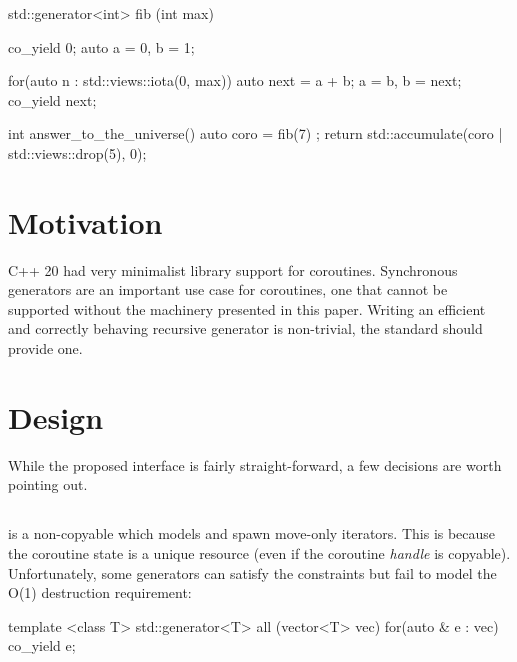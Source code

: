 \documentclass{wg21}
\begin{document}
\begin{colorblock}
    std::generator<int> fib (int max) {
        co_yield 0;
        auto a = 0, b = 1;

        for(auto n : std::views::iota(0, max))  {
            auto next = a + b;
            a = b, b = next;
            co_yield next;
        }
    }

    int answer_to_the_universe() {
        auto coro = fib(7) ;
        return std::accumulate(coro | std::views::drop(5), 0);
    }

\end{colorblock}

\section{Motivation}

C++ 20 had very minimalist library support for coroutines.
Synchronous generators are an important use case for coroutines, one that cannot be supported without
the machinery presented in this paper.
Writing an efficient and correctly behaving recursive generator is non-trivial, the standard should provide one.


\section{Design}

While the proposed  interface is fairly straight-forward, a few decisions are worth pointing out.

\subsection{}

 is a non-copyable  which models  and spawn move-only iterators.
This is because the coroutine state is a unique resource (even if the coroutine \textit{handle} is copyable).
Unfortunately, some generators can satisfy the  constraints but fail to model the  O(1)
destruction requirement:

\begin{colorblock}

    template <class T>
    std::generator<T> all (vector<T> vec) {
        for(auto & e : vec)  {
            co_yield e;
        }
    }

\end{colorblock}
\end{document}
